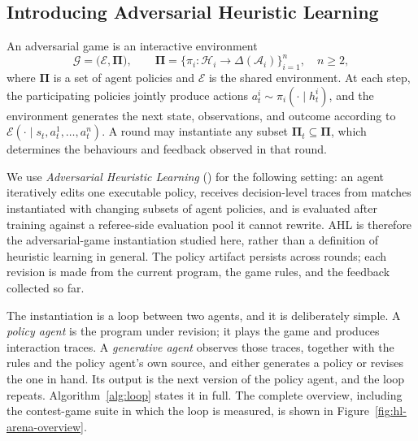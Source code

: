 \subsection{Introducing Adversarial Heuristic Learning}
\label{sec:hl-method}

\begin{definition}
An adversarial game is an interactive environment
\[
\mathcal{G}=\bigl(\mathcal{E},\boldsymbol{\Pi}\bigr),\qquad
\boldsymbol{\Pi}=\{\pi_i:\mathcal{H}_i\!\to\!\Delta(\mathcal{A}_i)\}_{i=1}^{n},\quad n\ge 2,
\]
where $\boldsymbol{\Pi}$ is a set of agent policies and $\mathcal{E}$ is the shared
environment. At each step, the participating policies jointly produce actions
$a_t^i\sim\pi_i(\cdot\mid h_t^i)$, and the environment generates the next state,
observations, and outcome according to
$\mathcal{E}(\cdot\mid s_t,a_t^1,\ldots,a_t^n)$. A round may instantiate any
subset $\boldsymbol{\Pi}_t\subseteq\boldsymbol{\Pi}$, which determines the
behaviours and feedback observed in that round.
\end{definition}

We use \emph{Adversarial Heuristic Learning} (\ahl) for the following setting:
an agent iteratively edits one executable policy, receives decision-level traces
from matches instantiated with changing subsets of agent policies, and is evaluated
after training against a referee-side evaluation pool it cannot rewrite. AHL is therefore the adversarial-game
instantiation studied here, rather than a definition of heuristic learning in
general. The policy artifact persists across rounds; each revision is made from
the current program, the game rules, and the feedback collected so far.

The instantiation is a loop between two agents, and it is deliberately simple. A
\emph{policy agent} is the program under revision; it plays the game and produces
interaction traces. A \emph{generative agent} observes those traces, together with
the rules and the policy agent's own source, and either generates a policy or
revises the one in hand. Its output is the next version of the policy agent, and
the loop repeats.
Algorithm~\ref{alg:loop} states it in full.
The complete overview, including the contest-game suite in which the loop is measured,
is shown in Figure~\ref{fig:hl-arena-overview}.

